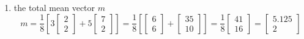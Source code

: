 \documentclass[12pt]{article}
\begin{document}
\begin{enumerate}
\item the total mean vector $m$
$$ m = \frac{1}{8}\left[3 \begin{bmatrix} 2 \\  2 \end{bmatrix} + 5 \begin{bmatrix} 7 \\ 2 \end{bmatrix}\right] = \frac{1}{8} \left[\begin{bmatrix} 6 \\ 6 \end{bmatrix} + \begin{bmatrix} 35 \\ 10 \end{bmatrix} \right]= \frac{1}{8} \begin{bmatrix} 41 \\ 16 \end{bmatrix} = \begin{bmatrix} 5.125 \\ 2 \end{bmatrix} $$ 


\end{enumerate}
\end{document}

